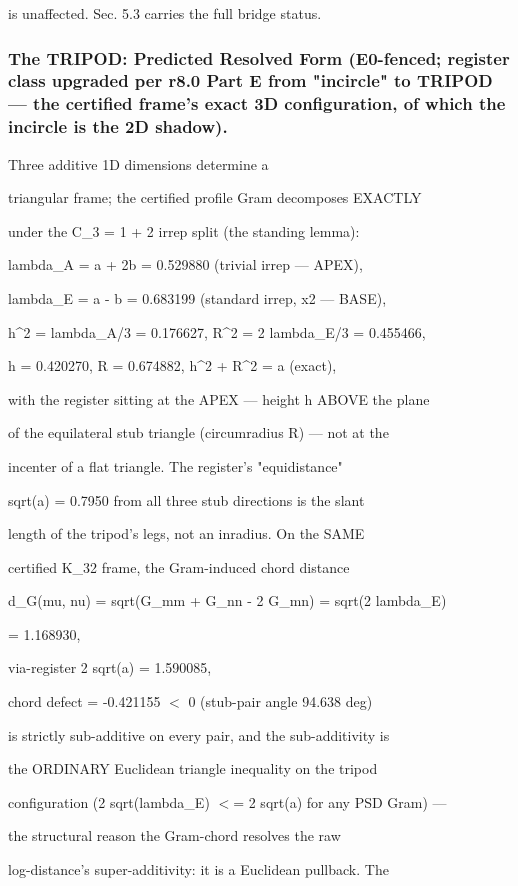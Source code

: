 \documentclass[11pt,a4paper]{article}
\theoremstyle{definition}
\begin{document}
is unaffected. Sec. 5.3 carries the full bridge status.


\subsubsection{The TRIPOD: Predicted Resolved Form (E0-fenced; register class upgraded per r8.0 Part E from "incircle" to TRIPOD — the certified frame's exact 3D configuration, of which the incircle is the 2D shadow).}
Three additive 1D dimensions determine a


triangular frame; the certified profile Gram decomposes EXACTLY

under the C\_3 = 1 + 2 irrep split (the standing lemma):


    lambda\_A = a + 2b = 0.529880  (trivial irrep — APEX),

    lambda\_E = a - b = 0.683199   (standard irrep, x2 — BASE),

    h\^{}2 = lambda\_A/3 = 0.176627, R\^{}2 = 2 lambda\_E/3 = 0.455466,

    h = 0.420270, R = 0.674882, h\^{}2 + R\^{}2 = a (exact),


with the register sitting at the APEX — height h ABOVE the plane

of the equilateral stub triangle (circumradius R) — not at the

incenter of a flat triangle. The register's "equidistance"

sqrt(a) = 0.7950 from all three stub directions is the slant

length of the tripod's legs, not an inradius. On the SAME

certified K\_32 frame, the Gram-induced chord distance


    d\_G(mu, nu) = sqrt(G\_mm + G\_nn - 2 G\_mn) = sqrt(2 lambda\_E)

    = 1.168930,

    via-register 2 sqrt(a) = 1.590085,

    chord defect = -0.421155 $<$ 0 (stub-pair angle 94.638 deg)


is strictly sub-additive on every pair, and the sub-additivity is

the ORDINARY Euclidean triangle inequality on the tripod

configuration (2 sqrt(lambda\_E) $<$= 2 sqrt(a) for any PSD Gram) —

the structural reason the Gram-chord resolves the raw

log-distance's super-additivity: it is a Euclidean pullback. The
\end{document}
